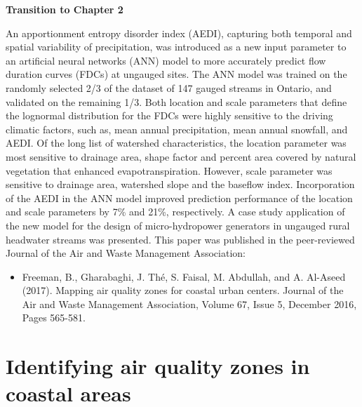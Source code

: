 \noindent \textbf{Transition to Chapter 2}

An apportionment entropy disorder index (AEDI), capturing both temporal and spatial variability of precipitation, was introduced as a new input parameter to an artificial neural networks (ANN) model to more accurately predict flow duration curves (FDCs) at ungauged sites. The ANN model was trained on the randomly selected 2/3 of the dataset of 147 gauged streams in Ontario, and validated on the remaining 1/3. Both location and scale parameters that define the lognormal distribution for the FDCs were highly sensitive to the driving climatic factors, such as, mean annual precipitation, mean annual snowfall, and AEDI. Of the long list of watershed characteristics, the location parameter was most sensitive to drainage area, shape factor and percent area covered by natural vegetation that enhanced evapotranspiration. However, scale parameter was sensitive to drainage area, watershed slope and the baseflow index. Incorporation of the AEDI in the ANN model improved prediction performance of the location and scale parameters by 7\% and 21\%, respectively. A case study application of the new model for the design of micro-hydropower generators in ungauged rural headwater streams was presented. This paper was published in the peer-reviewed Journal of the Air and Waste Management Association:

\begin{itemize}
	\item Freeman, B., Gharabaghi, J.  Th\'e, S. Faisal, M. Abdullah, and A. Al-Aseed (2017). Mapping air quality zones for coastal urban centers. Journal of the Air and Waste Management Association, Volume 67, Issue 5, December 2016, Pages 565-581.
\end{itemize}
\chapter{Identifying air quality zones in coastal areas}

